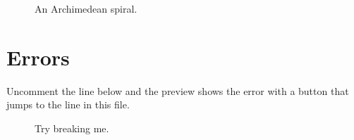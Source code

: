\documentclass[11pt]{article}
\begin{document}
\begin{figure}[ht]
  \centering
  
  \caption{An Archimedean spiral.}
  \label{fig:spiral}
\end{figure}

\section{Errors}
Uncomment the line below and the preview shows the error with a button that jumps to the
line in this file.

\begin{figure}[ht]
  \centering
  \caption{Try breaking me.}
  \label{fig:broken}
\end{figure}
\end{document}
